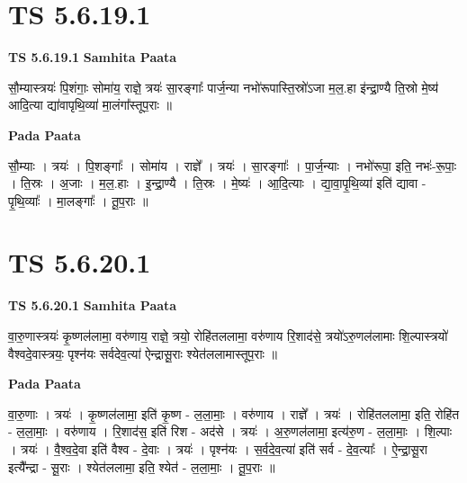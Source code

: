 \documentclass[17pt]{extarticle}
\begin{document}
\section*{ TS 5.6.19.1 }

\textbf{TS 5.6.19.1 } \newline
\textbf{Samhita Paata} \newline

सौ॒म्यास्त्रयः॑ पि॒शंगाः॒ सोमा॑य॒ राज्ञे॒ त्रयः॑ सा॒रङ्गाः᳚ पार्ज॒न्या नभो॑रूपास्ति॒स्रो॑ऽजा म॒ल॒.हा इ॑न्द्रा॒ण्यै ति॒स्रो मे॒ष्य॑ आदि॒त्या द्या॑वापृथि॒व्या॑ मा॒लंगा᳚स्तूप॒राः ॥ \newline

\textbf{Pada Paata} \newline

सौ॒म्याः । त्रयः॑ । पि॒शङ्गाः᳚ । सोमा॑य । राज्ञे᳚ । त्रयः॑ । सा॒रङ्गाः᳚ । पा॒र्ज॒न्याः । नभो॑रूपा॒ इति॒ नभः॑-रू॒पाः॒ । ति॒स्रः । अ॒जाः । म॒ल॒.हाः । इ॒न्द्रा॒ण्यै । ति॒स्रः । मे॒ष्यः॑ । आ॒दि॒त्याः । द्या॒वा॒पृ॒थि॒व्या॑ इति॑ द्यावा - पृ॒थि॒व्याः᳚ । मा॒लङ्गाः᳚ । तू॒प॒राः ॥  \newline




\section*{ TS 5.6.20.1 }

\textbf{TS 5.6.20.1 } \newline
\textbf{Samhita Paata} \newline

वा॒रु॒णास्त्रयः॑ कृ॒ष्णल॑लामा॒ वरु॑णाय॒ राज्ञे॒ त्रयो॒ रोहि॑तललामा॒ वरु॑णाय रि॒शाद॑से॒ त्रयो॑ऽरु॒णल॑लामाः शि॒ल्पास्त्रयो॑ वैश्वदे॒वास्त्रयः॒ पृश्न॑यः सर्वदेव॒त्या॑ ऐन्द्रासू॒राः श्येत॑ललामास्तूप॒राः ॥ \newline

\textbf{Pada Paata} \newline

वा॒रु॒णाः । त्रयः॑ । कृ॒ष्णल॑लामा॒ इति॑ कृ॒ष्ण - ल॒ला॒माः॒ । वरु॑णाय । राज्ञे᳚ । त्रयः॑ । रोहि॑तललामा॒ इति॒ रोहि॑त - ल॒ला॒माः॒ । वरु॑णाय । रि॒शाद॑स॒ इति॑ रिश - अद॑से । त्रयः॑ । अ॒रु॒णल॑लामा॒ इत्य॑रु॒ण - ल॒ला॒माः॒ । शि॒ल्पाः । त्रयः॑ । वै॒श्व॒दे॒वा इति॑ वैश्व - दे॒वाः । त्रयः॑ । पृश्न॑यः । स॒र्व॒दे॒व॒त्या॑ इति॑ सर्व - दे॒व॒त्याः᳚ । ऐ॒न्द्रा॒सू॒रा इत्यै᳚न्द्रा - सू॒राः । श्येत॑ललामा॒ इति॒ श्येत॑ - ल॒ला॒माः॒ । तू॒प॒राः ॥  \newline
\end{document}
